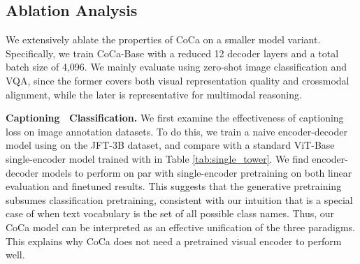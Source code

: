 \subsection{Ablation Analysis}
We extensively ablate the properties of CoCa on a smaller model variant.
Specifically,
we train CoCa-Base with a reduced 12 decoder layers and a total batch size of 4,096.
We mainly evaluate using zero-shot image classification and VQA,
since the former covers both visual representation quality and crossmodal alignment,
while the later is representative for multimodal reasoning.

\textbf{Captioning \vs \ Classification.}
We first examine the effectiveness of captioning loss on image annotation datasets.
To do this,
we train a naive encoder-decoder model using  on the JFT-3B dataset,
and compare with a standard ViT-Base single-encoder model trained with  in Table \ref{tab:single_tower}.
We find encoder-decoder models to perform on par with single-encoder pretraining on both linear evaluation and finetuned results.
This suggests that the generative pretraining subsumes classification pretraining,
consistent with our intuition that  is a special case of  when text vocabulary is the set of all possible class names.
Thus, our CoCa model can be interpreted as an effective unification of the three paradigms.
This explains why CoCa does not need a pretrained visual encoder to perform well.

